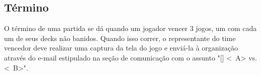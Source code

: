 \subsection{Término}

O término de uma partida se dá quando um jogador vencer 3 jogos, um com cada um de seus decks não banidos. Quando isso correr, o representante do time vencedor deve realizar uma captura da tela do jogo e enviá-la à organização através do e-mail estipulado na seção de comunicação com o assunto "[\Modality] <\BasicUnit\ A> vs. <\BasicUnit\ B>".